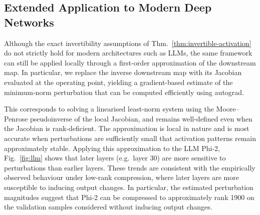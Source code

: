 \documentclass{article}
\theoremstyle{plain}
\theoremstyle{definition}
\theoremstyle{remark}
\begin{document}
\subsection{Extended Application to Modern Deep Networks}
Although the exact invertibility assumptions of Thm.~\ref{thm:invertible-activation} do not strictly hold for modern architectures such as LLMs, the same framework can still be applied locally through a first-order approximation of the downstream map. In particular, we replace the inverse downstream map with its Jacobian evaluated at the operating point, yielding a gradient-based estimate of the minimum-norm perturbation that can be computed efficiently using autograd.

This corresponds to solving a linearised least-norm system using the Moore--Penrose pseudoinverse of the local Jacobian, and remains well-defined even when the Jacobian is rank-deficient. The approximation is local in nature and is most accurate when perturbations are sufficiently small that activation patterns remain approximately stable.
Applying this approximation to the LLM Phi-2, Fig.~\ref{fig:llm} shows that later layers (e.g.\ layer 30) are more sensitive to perturbations than earlier layers. These trends are consistent with the empirically observed behaviour under low-rank compression, where later layers are more susceptible to inducing output changes. In particular, the estimated perturbation magnitudes suggest that Phi-2 can be compressed to approximately rank 1900 on the validation samples considered without inducing output changes.
\end{document}
